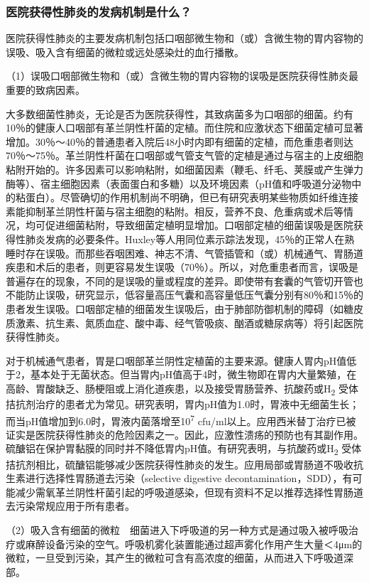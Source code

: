 \subsubsection{医院获得性肺炎的发病机制是什么？}

医院获得性肺炎的主要发病机制包括口咽部微生物和（或）含微生物的胃内容物的误吸、吸入含有细菌的微粒或远处感染灶的血行播散。

（1）误吸口咽部微生物和（或）含微生物的胃内容物的误吸是医院获得性肺炎最重要的致病因素。

大多数细菌性肺炎，无论是否为医院获得性，其致病菌多为口咽部的细菌。约有10％的健康人口咽部有革兰阴性杆菌的定植。而住院和应激状态下细菌定植可显著增加。30％～40％的普通患者入院后48小时内即有细菌的定植，而危重患者则达70％～75％。革兰阴性杆菌在口咽部或气管支气管的定植是通过与宿主的上皮细胞粘附开始的。许多因素可以影响粘附，如细菌因素（鞭毛、纤毛、荚膜或产生弹力酶等）、宿主细胞因素（表面蛋白和多糖）以及环境因素（pH值和呼吸道分泌物中的粘蛋白）。尽管确切的作用机制尚不明确，但已有研究表明某些物质如纤维连接素能抑制革兰阴性杆菌与宿主细胞的粘附。相反，营养不良、危重病或术后等情况，均可促进细菌粘附，导致细菌定植明显增加。口咽部定植的细菌误吸是医院获得性肺炎发病的必要条件。Huxley等人用同位素示踪法发现，45％的正常人在熟睡时存在误吸。而那些吞咽困难、神志不清、气管插管和（或）机械通气、胃肠道疾患和术后的患者，则更容易发生误吸（70％）。所以，对危重患者而言，误吸是普遍存在的现象，不同的是误吸的量或程度的差异。即使带有套囊的气管切开管也不能防止误吸，研究显示，低容量高压气囊和高容量低压气囊分别有80％和15％的患者发生误吸。口咽部定植的细菌发生误吸后，由于肺部防御机制的障碍（如糖皮质激素、抗生素、氮质血症、酸中毒、经气管吸痰、酗酒或糖尿病等）将引起医院获得性肺炎。

对于机械通气患者，胃是口咽部革兰阴性定植菌的主要来源。健康人胃内pH值低于2，基本处于无菌状态。但当胃内pH值高于4时，微生物即在胃内大量繁殖，在高龄、胃酸缺乏、肠梗阻或上消化道疾患，以及接受胃肠营养、抗酸药或H\textsubscript{2}
受体拮抗剂治疗的患者尤为常见。研究表明，胃内pH值为1.0时，胃液中无细菌生长；而当pH值增加到6.0时，胃液内菌落增至10\textsuperscript{7}
cfu/ml以上。应用西米替丁治疗已被证实是医院获得性肺炎的危险因素之一。因此，应激性溃疡的预防也有其副作用。硫醣铝在保护胃黏膜的同时并不降低胃内pH值。有研究表明，与抗酸药或H\textsubscript{2}
受体拮抗剂相比，硫醣铝能够减少医院获得性肺炎的发生。应用局部或胃肠道不吸收抗生素进行选择性胃肠道去污染（selective
digestive
decontamination，SDD），有可能减少需氧革兰阴性杆菌引起的呼吸道感染，但现有资料不足以推荐选择性胃肠道去污染常规应用于所有患者。

（2）吸入含有细菌的微粒　细菌进入下呼吸道的另一种方式是通过吸入被呼吸治疗或麻醉设备污染的空气。呼吸机雾化装置能通过超声雾化作用产生大量＜4μm的微粒，一旦受到污染，其产生的微粒可含有高浓度的细菌，从而进入下呼吸道深部。

